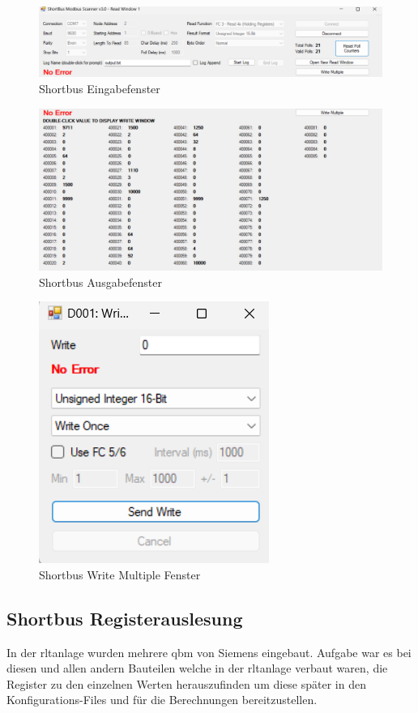 \begin{figure}[H]
	\centering
	\includegraphics[width=1\linewidth]{Bilder/shortbus_eingabe}
	\caption{Shortbus Eingabefenster} 
	\label{fig:Shortbuseingabe}
\end{figure}


\begin{figure}[H]
	\centering
	\includegraphics[width=1\linewidth]{Bilder/shortbus_ausgabe}
	\caption{Shortbus Ausgabefenster} 
	\label{fig:Shortbusausgabe}
\end{figure}

\begin{figure}[H]
	\centering
	\includegraphics[width=0.3\linewidth]{Bilder/write_multiple_fenster}
	\caption{Shortbus Write Multiple Fenster} 
	\label{fig:writemultiple}
\end{figure}

\subsection{Shortbus Registerauslesung}

In der \ac{rltanlage} wurden mehrere \gls{qbm} von Siemens eingebaut. Aufgabe war es bei diesen und allen andern Bauteilen welche in der \ac{rltanlage} verbaut waren, die Register zu den einzelnen Werten herauszufinden um diese später in den Konfigurations-Files und für die Berechnungen bereitzustellen. 

